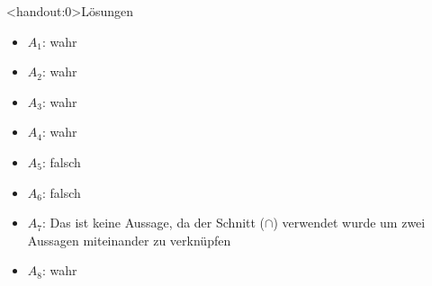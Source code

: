 {
\begin{frame}<handout:0>{Lösungen}
  \begin{itemize}[<+- | alert@+>]
        \item
            $A_1$: wahr
        \item
            $A_2$: wahr
        \item
            $A_3$: wahr
        \item
            $A_4$: wahr
        \item
            $A_5$: falsch
       	\item
       		$A_6$: falsch
        \item
            $A_7$: Das ist keine Aussage, da der Schnitt ($\cap$) verwendet wurde um zwei Aussagen miteinander zu verknüpfen
       	\item
       		$A_8$: wahr
    \end{itemize}
\end{frame}
}


